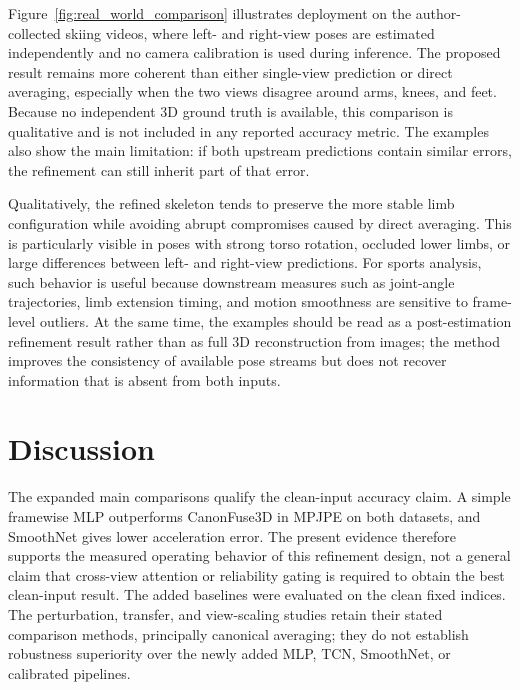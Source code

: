 \documentclass[preprint,12pt]{elsarticle}
\begin{document}
Figure~\ref{fig:real_world_comparison} illustrates deployment on the author-collected skiing videos, where left- and right-view poses are estimated independently and no camera calibration is used during inference. The proposed result remains more coherent than either single-view prediction or direct averaging, especially when the two views disagree around arms, knees, and feet. Because no independent 3D ground truth is available, this comparison is qualitative and is not included in any reported accuracy metric. The examples also show the main limitation: if both upstream predictions contain similar errors, the refinement can still inherit part of that error.

Qualitatively, the refined skeleton tends to preserve the more stable limb configuration while avoiding abrupt compromises caused by direct averaging. This is particularly visible in poses with strong torso rotation, occluded lower limbs, or large differences between left- and right-view predictions. For sports analysis, such behavior is useful because downstream measures such as joint-angle trajectories, limb extension timing, and motion smoothness are sensitive to frame-level outliers. At the same time, the examples should be read as a post-estimation refinement result rather than as full 3D reconstruction from images; the method improves the consistency of available pose streams but does not recover information that is absent from both inputs.

\FloatBarrier
\section{Discussion}

The expanded main comparisons qualify the clean-input accuracy claim. A simple framewise MLP outperforms CanonFuse3D in MPJPE on both datasets, and SmoothNet gives lower acceleration error. The present evidence therefore supports the measured operating behavior of this refinement design, not a general claim that cross-view attention or reliability gating is required to obtain the best clean-input result. The added baselines were evaluated on the clean fixed indices. The perturbation, transfer, and view-scaling studies retain their stated comparison methods, principally canonical averaging; they do not establish robustness superiority over the newly added MLP, TCN, SmoothNet, or calibrated pipelines.
\label{sec:discussion}
\end{document}
